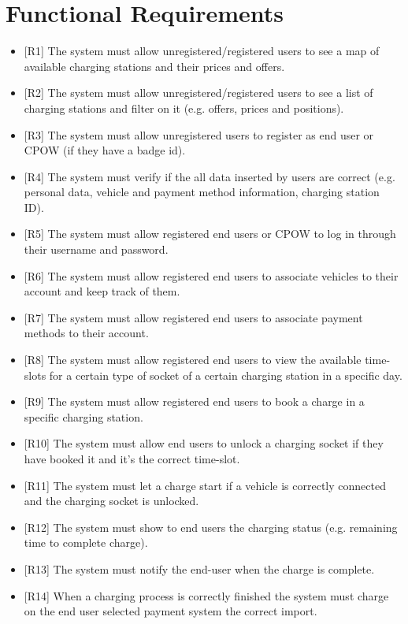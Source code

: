 \documentclass[a4paper]{report}
\begin{document}
\section{Functional Requirements}
\begin{itemize}
    \item{[R1]} \label{R1} The system must allow unregistered/registered users to see a map of available charging stations and their prices and offers.
    \item{[R2]} \label{R2} The system must allow unregistered/registered users to see a list of charging stations and filter on it (e.g. offers, prices and positions).
    \item{[R3]} \label{R3} The system must allow unregistered users to register as end user or CPOW (if they have a badge id).
    \item{[R4]} \label{R4} The system must verify if the all data inserted by users are correct (e.g. personal data, vehicle and payment method information, charging station ID).   
    \item{[R5]} \label{R5} The system must allow registered end users or CPOW to log in through their username and password.
    \item{[R6]} \label{R6} The system must allow registered end users to associate vehicles to their account and keep track of them.
    \item{[R7]} \label{R7} The system must allow registered end users to associate payment methods to their account.
    \item{[R8]} \label{R8} The system must allow registered end users to view the available time-slots for a certain type of socket of a certain charging station in a specific day.
    \item{[R9]} \label{R9} The system must allow registered end users to book a charge in a specific charging station.
    \item{[R10]} \label{R10} The system must allow end users to unlock a charging socket if they have booked it and it's the correct time-slot.
    \item{[R11]} \label{R11} The system must let a charge start if a vehicle is correctly connected and the charging socket is unlocked.
    \item{[R12]} \label{R12} The system must show to end users the charging status (e.g. remaining time to complete charge).
    \item{[R13]} \label{R13} The system must notify the end-user when the charge is complete.
    \item{[R14]} \label{R14} When a charging process is correctly finished the system must charge on the end user selected payment system the correct import.

\end{itemize}
\end{document}
